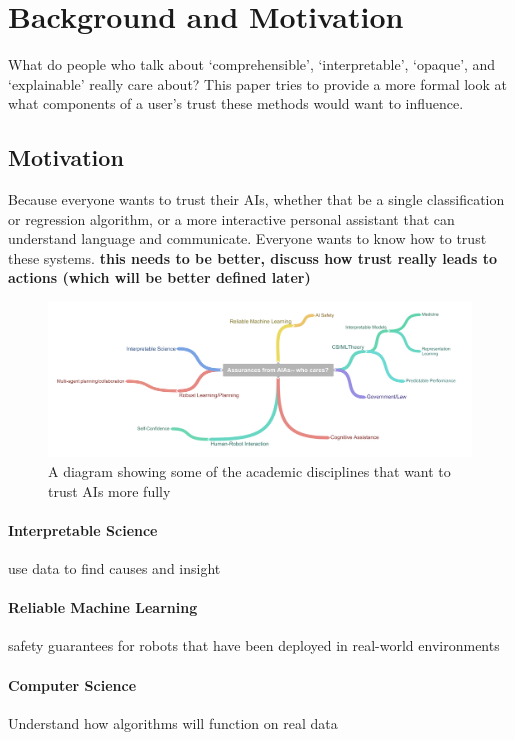 \section{Background and Motivation} \label{sec:background}

What do people who talk about `comprehensible', `interpretable', `opaque', and `explainable' really care about? This paper tries to provide a more formal look at what components of a user's trust these methods would want to influence.

\subsection{Motivation}
    Because everyone wants to trust their AIs, whether that be a single classification or regression algorithm, or a more interactive personal assistant that can understand language and communicate. Everyone wants to know how to trust these systems. \textbf{this needs to be better, discuss how trust really leads to actions (which will be better defined later)}

	\begin{figure}
        \includegraphics[width=7.5in]{Figures/WhoCares_cleaned}%
    	\caption{A diagram showing some of the academic disciplines that want to trust AIs more fully}
        \label{fig:WhoCares}
    \end{figure}

    \paragraph{Interpretable Science} use data to find causes and insight
    \paragraph{Reliable Machine Learning} safety guarantees for robots that have been deployed in real-world environments
    \paragraph{Computer Science} Understand how algorithms will function on real data
